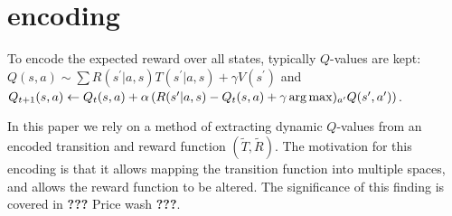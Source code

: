 \section*{encoding}

To encode the expected reward over all states, typically $Q$-values are kept: \( Q(s,a) \sim \sum R(s^\prime|a,s)T(s^\prime|a,s)+\gamma V(s^\prime) \) and \( Q_{t+1}(s,a) \leftarrow Q_t(s,a)+\alpha \left( R(s^\prime|a,s)-Q_t(s,a)+\gamma\operatorname*{arg\,max})_{a^\prime} Q(s^\prime,a^\prime) \right) \).

In this paper we rely on a method of extracting dynamic $Q$-values from an encoded transition and reward function $( \tilde{T}, \tilde{R} )$. The motivation for this encoding is that it allows mapping the transition function into multiple spaces, and allows the reward function to be altered. The significance of this finding is covered in \textbf{???} Price wash \textbf{???}.

 
